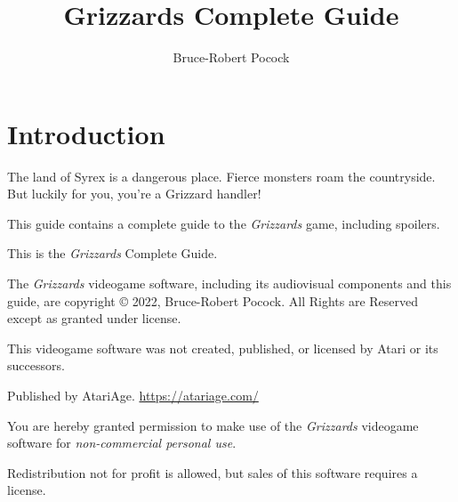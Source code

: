 \documentclass[10pt,twocolumn]{memoir}
\title{Grizzards Complete Guide}
\author{Bruce-Robert Pocock}
\begin{document}
\frontmatter

\maketitle

\thispagestyle{empty}

\chapter*{Introduction}\label{Introduction}

The  land of  Syrex  is  a dangerous  place.  Fierce  monsters roam  the
countryside. But luckily for you, you're a Grizzard handler!

\bigskip

This guide  contains a  complete guide  to the  \textit{Grizzards} game,
including spoilers.

\vspace{1in}\vfill

This is the \textit{Grizzards} Complete Guide.

\vspace{12pt}

The  \textit{Grizzards} videogame  software,  including its  audiovisual
components and this guide, are copyright \copyright{} 2022, Bruce-Robert
Pocock. All Rights are Reserved except as granted under license.

\bigskip

This videogame software was not created, published, or licensed by Atari
or its successors.

\vspace{12pt}

Published by AtariAge. \href{https://atariage.com/}{https://atariage.com/}

\bigskip

You are hereby granted permission  to make use of the \textit{Grizzards}
videogame software for \emph{non-commercial personal use}.

Redistribution not for profit is allowed, but sales of this software
requires a license.

\let\cleardoublepage\clearpage

\mainmatter

\setcounter{secnumdepth}{3}
\tableofcontents
\end{document}
